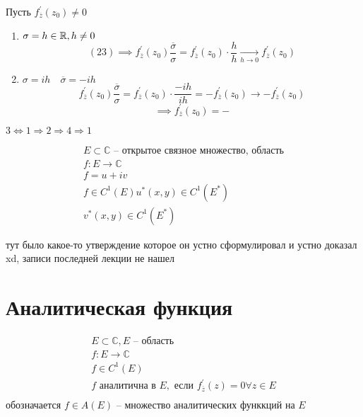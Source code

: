 \documentclass[main]{subfiles}
\begin{document}
\begin{longProof}
    Пусть $f^\prime_{\overline{z}}(z_0) \ne 0$
    \begin{enumerate}
        \item $\sigma = h \in \mathbb{R}, h \ne 0$
        \[ (23) \implies f^\prime_{\overline{z}}(z_0) \frac{\overline{\sigma}}{\sigma} = 
        f^\prime_{\overline{z}}(z_0) \cdot \frac{h}{h} \underset{h \to 0}{\longrightarrow} f^\prime_{\overline{z}}(z_0)\]
        \item $\sigma = ih \quad \overline{\sigma} = -ih$
        \[  f^\prime_{\overline{z}}(z_0) \frac{\overline{\sigma}}{\sigma} = f^\prime_{\overline{z}}(z_0) \cdot \frac{-ih}{ih} = -f^\prime_{\overline{z}}(z_0) \longrightarrow -f^\prime_{\overline{z}}(z_0) \] 
        \[ \implies f^\prime_{\overline{z}}(z_0) = - \]
    \end{enumerate}
    $3 \Leftrightarrow 1 \Rightarrow 2 \Rightarrow 4 \Rightarrow 1$
\end{longProof}

\begin{definition}
    \begin{gather*}
        E \subset \mathbb{C} \text{ -- открытое связное множество, область} \\
        f: E \rightarrow \mathbb{C} \\
        f = u + iv \\
        f \in C^1(E)
        u^*(x,y) \in C^1(E^*) \\
        v^*(x,y) \in C^1(E^*)
    \end{gather*}
\end{definition}

\begin{proposition}
    тут было какое-то утверждение которое он устно сформулировал и устно доказал xd, записи последней лекции не нашел
\end{proposition}

\section{Аналитическая функция}

\begin{definition}
    \begin{gather*}
        E \subset \mathbb{C}, E \text{ --  область} \\
        f: E \rightarrow \mathbb{C} \\
        f \in C^1(E) \\
        f \text{ аналитична в } E, \text{ если } f^\prime_{\overline{z}}(z) = 0 \forall z \in E \tag{1}  \\
    \end{gather*}
    обозначается  $f \in A(E)$ -- множество аналитических функкций на $E$
\end{definition}
\end{document}
